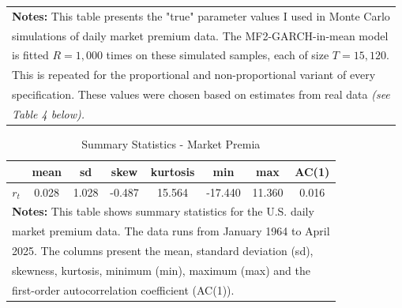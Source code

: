 \documentclass[12pt]{article}
\begin{document}
\begin{table}[!ht]
\begin{tabular}{ccccccccccc}
\multicolumn{11}{l}{\textbf{Notes:} This table presents the "true" parameter values I used in Monte Carlo}\\
\multicolumn{11}{l}{simulations of daily market premium data. The MF2-GARCH-in-mean model}\\
\multicolumn{11}{l}{is fitted $R=1,000$ times on these simulated samples, each of size $T=15,120$.}\\
\multicolumn{11}{l}{This is repeated for the proportional and non-proportional variant of every}\\
\multicolumn{11}{l}{specification. These values were chosen based on estimates from real data \textit{(see}}\\
\multicolumn{11}{l}{\textit{Table 4 below).}}\\
\midrule
\midrule
\end{tabular}
\end{table}

\begin{table}[!ht]
\centering
\caption{Summary Statistics - Market Premia}
\begin{tabular}{cccccccc}
\midrule
\midrule
\mbox{} & mean & sd & skew & kurtosis & min & max & AC(1)\\
\midrule
$r_t$ & 0.028 & 1.028 & -0.487 & 15.564 & -17.440 & 11.360 & 0.016\\
\midrule
\multicolumn{8}{l}{\textbf{Notes:} This table shows summary statistics for the U.S. daily}\\
\multicolumn{8}{l}{market premium data. The data runs from January 1964 to April}\\
\multicolumn{8}{l}{2025. The columns present the mean, standard deviation (sd),}\\
\multicolumn{8}{l}{skewness, kurtosis, minimum (min), maximum (max) and the}\\
\multicolumn{8}{l}{first-order autocorrelation coefficient (AC(1)).}\\
\midrule
\midrule
\end{tabular}
\end{table}
\end{document}
